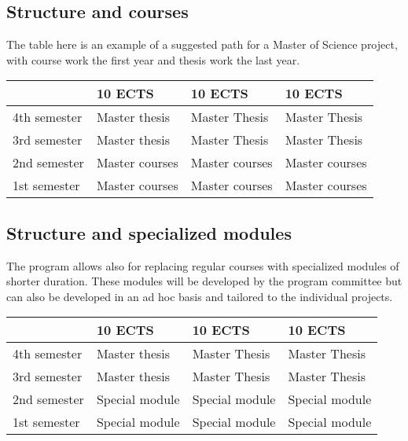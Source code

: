 \documentclass[%
oneside,                 %
final,                   %
10pt]{article}
\begin{document}
\subsection{Structure and courses}
\begin{block}{}
The table here is an example of a suggested path for a Master of Science project,
with course work the first year and thesis work the last year.


{\footnotesize
\begin{tabular}{llll}
\hline
\multicolumn{1}{l}{  } & \multicolumn{1}{l}{ 10 ECTS } & \multicolumn{1}{l}{ 10 ECTS } & \multicolumn{1}{l}{ 10 ECTS } \\
\hline
4th semester & Master thesis  & Master Thesis  & Master Thesis  \\
\hline
3rd semester & Master thesis  & Master Thesis  & Master Thesis  \\
\hline
2nd semester & Master courses & Master courses & Master courses \\
\hline
1st semester & Master courses & Master courses & Master courses \\
\hline
\end{tabular}
}

\noindent
\end{block}

\subsection{Structure and specialized modules}
\begin{block}{}
The program allows also for replacing regular courses with specialized modules of shorter duration.
These modules will be developed by the program committee but can also be developed in an ad hoc basis
and tailored to the individual projects. 



{\footnotesize
\begin{tabular}{llll}
\hline
\multicolumn{1}{l}{  } & \multicolumn{1}{l}{ 10 ECTS } & \multicolumn{1}{l}{ 10 ECTS } & \multicolumn{1}{l}{ 10 ECTS } \\
\hline
4th semester & Master thesis  & Master Thesis  & Master Thesis  \\
\hline
3rd semester & Master thesis  & Master Thesis  & Master Thesis  \\
\hline
2nd semester & Special module & Special module & Special module \\
\hline
1st semester & Special module & Special module & Special module \\
\hline
\end{tabular}
}

\noindent
\end{block}
\end{document}
